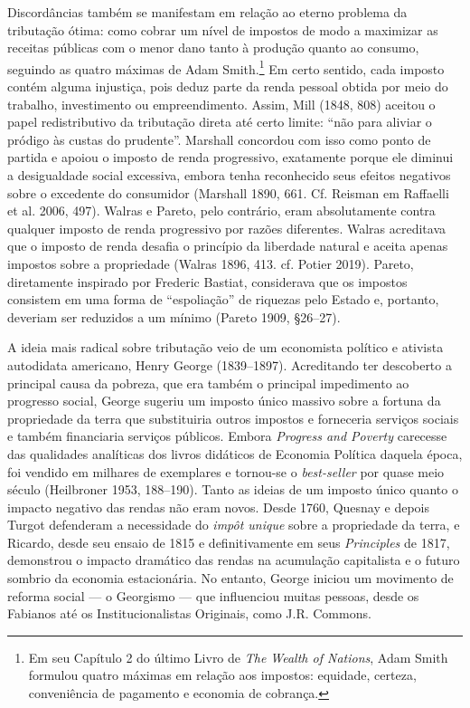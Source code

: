 \documentclass[12pt]{article}
\begin{document}
Discordâncias também se manifestam em relação ao eterno problema da tributação ótima: como cobrar um nível de impostos de modo a maximizar as receitas públicas com o menor dano tanto à produção quanto ao consumo, seguindo as quatro máximas de Adam Smith.\footnote{Em seu Capítulo 2 do último Livro de \textit{The Wealth of Nations}, Adam Smith formulou quatro máximas em relação aos impostos: equidade, certeza, conveniência de pagamento e economia de cobrança.} Em certo sentido, cada imposto contém alguma injustiça, pois deduz parte da renda pessoal obtida por meio do trabalho, investimento ou empreendimento. Assim, Mill (1848, 808) aceitou o papel redistributivo da tributação direta até certo limite: “não para aliviar o pródigo às custas do prudente”. Marshall concordou com isso como ponto de partida e apoiou o imposto de renda progressivo, exatamente porque ele diminui a desigualdade social excessiva, embora tenha reconhecido seus efeitos negativos sobre o excedente do consumidor (Marshall 1890, 661. Cf. Reisman em Raffaelli et al. 2006, 497). Walras e Pareto, pelo contrário, eram absolutamente contra qualquer imposto de renda progressivo por razões diferentes. Walras acreditava que o imposto de renda desafia o princípio da liberdade natural e aceita apenas impostos sobre a propriedade (Walras 1896, 413. cf. Potier 2019). Pareto, diretamente inspirado por Frederic Bastiat, considerava que os impostos consistem em uma forma de “espoliação” de riquezas pelo Estado e, portanto, deveriam ser reduzidos a um mínimo (Pareto 1909, §26–27).

A ideia mais radical sobre tributação veio de um economista político e ativista autodidata americano, Henry George (1839–1897). Acreditando ter descoberto a principal causa da pobreza, que era também o principal impedimento ao progresso social, George sugeriu um imposto único massivo sobre a fortuna da propriedade da terra que substituiria outros impostos e forneceria serviços sociais e também financiaria serviços públicos. Embora \textit{Progress and Poverty} carecesse das qualidades analíticas dos livros didáticos de Economia Política daquela época, foi vendido em milhares de exemplares e tornou-se o \textit{best-seller} por quase meio século (Heilbroner 1953, 188–190). Tanto as ideias de um imposto único quanto o impacto negativo das rendas não eram novos. Desde 1760, Quesnay e depois Turgot defenderam a necessidade do \textit{impôt unique} sobre a propriedade da terra, e Ricardo, desde seu ensaio de 1815 e definitivamente em seus \textit{Principles} de 1817, demonstrou o impacto dramático das rendas na acumulação capitalista e o futuro sombrio da economia estacionária. No entanto, George iniciou um movimento de reforma social — o Georgismo — que influenciou muitas pessoas, desde os Fabianos até os Institucionalistas Originais, como J.R. Commons.
\end{document}
